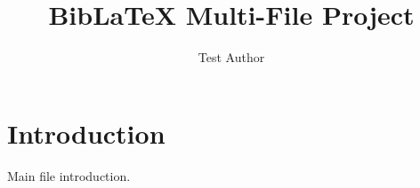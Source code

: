 \documentclass{article}
\begin{document}
\title{BibLaTeX Multi-File Project}
\author{Test Author}
\maketitle

\section{Introduction}

Main file introduction.



\printbibliography
\end{document}
